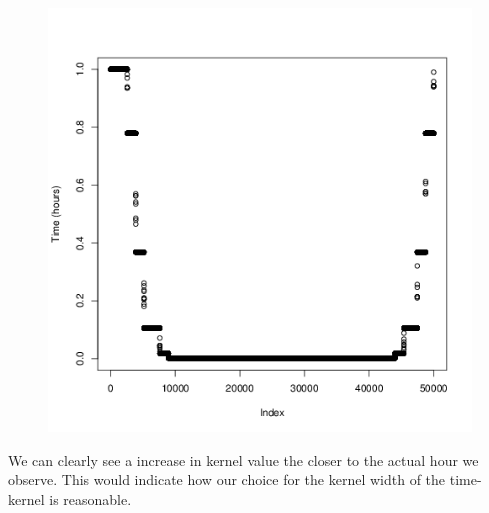 \documentclass[a4paper, 12pt]{article}
\begin{document}
\begin{figure}[H]
\begin{minipage}[]{0.2\textwidth}
        \end{minipage}
        \begin{minipage}[]{0.2\textwidth}
            \includegraphics[width=\textwidth]{share/11_time.png}
        \end{minipage}
    \end{figure}

    We can clearly see a increase in kernel value the closer to the actual hour we observe. This would indicate how our choice for the kernel width of the time-kernel is reasonable.
\end{document}
